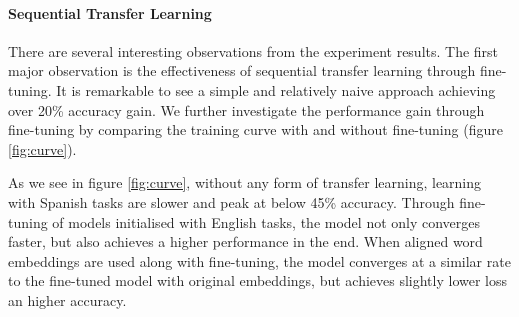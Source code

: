 \documentclass[]{article}
\begin{document}
\paragraph{Sequential Transfer Learning}
There are several interesting observations from the experiment results. The first major observation is the effectiveness of sequential transfer learning through fine-tuning. It is remarkable to see a simple and relatively naive approach achieving over 20\% accuracy gain. We further investigate the performance gain through fine-tuning by comparing the training curve with and without fine-tuning (figure \ref{fig:curve}).

As we see in figure \ref{fig:curve}, without any form of transfer learning, learning with Spanish tasks are slower and peak at below 45\% accuracy. Through fine-tuning of models initialised with English tasks, the model not only converges faster, but also achieves a higher performance in the end. When aligned word embeddings are used along with fine-tuning, the model converges at a similar rate to the fine-tuned model with original embeddings, but achieves slightly lower loss an higher accuracy.
\end{document}
